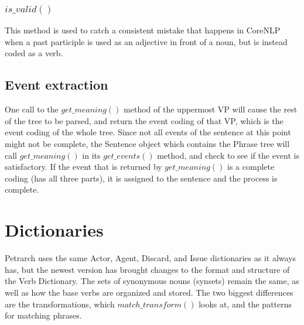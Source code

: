 \documentclass[11pt]{article}
\begin{document}
\subsubsection{$is\_valid()$}
This method is used to catch a consistent mistake that happens in CoreNLP when a 
past participle is used as an adjective in front of a noun, but is instead coded 
as a verb.

\subsection{Event extraction}
One call to the $get\_meaning()$ method of the uppermost VP will cause the rest 
of the tree to be parsed, and return the event coding of that VP, which is the 
event coding of the whole tree. Since not all events of the sentence at this 
point might not be complete, the Sentence object which contains the Phrase tree
will call $get\_meaning()$ in its $get\_events()$ method, and check to see if 
the event is satisfactory. If the event that is
returned by $get\_meaning()$ is a complete coding (has all three parts), it is assigned to the 
sentence and the process is complete.

\section{Dictionaries}
Petrarch uses the same Actor, Agent, Discard, and Issue dictionaries as it 
always has, but the newest version has brought changes to the format and 
structure of the Verb Dictionary. The sets of synonymous nouns (synsets) remain 
the same, as well as how the base verbs are organized and stored. The two 
biggest differences are the transformations, which $match\_transform()$ looks at,
and the patterns for matching phrases. 
\end{document}
